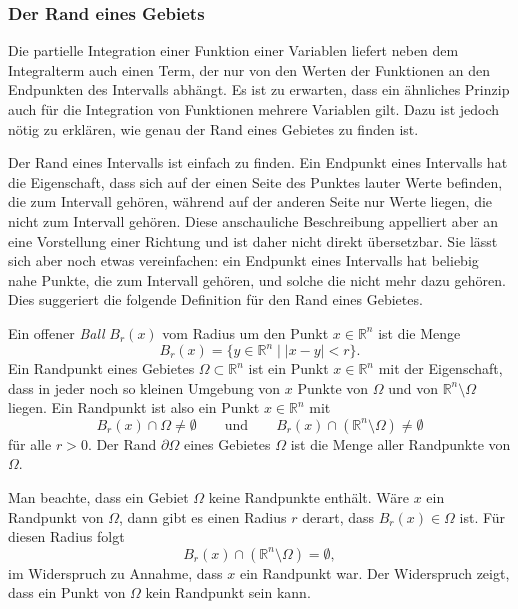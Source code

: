 %
%
\subsubsection{Der Rand eines Gebiets}
Die partielle Integration einer Funktion einer Variablen liefert
neben dem Integralterm auch einen Term, der nur von den Werten der
Funktionen an den Endpunkten des Intervalls abhängt.
Es ist zu erwarten, dass ein ähnliches Prinzip auch für die
Integration von Funktionen mehrere Variablen gilt.
Dazu ist jedoch nötig zu erklären, wie genau der Rand eines
Gebietes zu finden ist.

Der Rand eines Intervalls ist einfach zu finden.
Ein Endpunkt eines Intervalls hat die Eigenschaft, dass sich
auf der einen Seite des Punktes lauter Werte befinden, die zum
Intervall gehören, während auf der anderen Seite nur Werte liegen,
die nicht zum Intervall gehören.
Diese anschauliche Beschreibung appelliert aber an eine Vorstellung
einer Richtung und ist daher nicht direkt übersetzbar.
Sie lässt sich aber noch etwas vereinfachen: ein Endpunkt eines
Intervalls hat beliebig nahe Punkte, die zum Intervall gehören, und
solche die nicht mehr dazu gehören.
Dies suggeriert die folgende Definition für den Rand eines Gebietes.

\begin{definition}[Rand]
\label{buch:felder:fundamentallemma:def:rand}
Ein offener {\em Ball} $B_r(x)$ vom Radius um den Punkt $x\in\mathbb{R}^n$
%
ist die Menge
\[
B_r(x)
=
\{y\in\mathbb{R}^n \mid |x-y|<r\}.
\]
Ein Randpunkt eines Gebietes $\Omega\subset\mathbb{R}^n$ ist ein Punkt
$x\in\mathbb{R}^n$ mit der Eigenschaft, dass in jeder noch so kleinen 
Umgebung von $x$ Punkte von $\Omega$ und von $\mathbb{R}^n\setminus\Omega$
liegen.
Ein Randpunkt ist also ein Punkt $x\in\mathbb{R}^n$ mit
\[
B_r(x)\cap \Omega\ne \emptyset
\qquad\text{und}\qquad
B_r(x)\cap (\mathbb{R}^n\setminus \Omega)
\ne \emptyset
\]
für alle $r>0$.
Der Rand $\partial \Omega$ eines Gebietes $\Omega$ ist die Menge
aller Randpunkte von $\Omega$.
\end{definition}

Man beachte, dass ein Gebiet $\Omega$ keine Randpunkte enthält.
Wäre $x$ ein Randpunkt von $\Omega$, dann gibt es einen Radius $r$
derart, dass $B_r(x)\in\Omega$ ist.
Für diesen Radius folgt
\[
B_r(x)\cap (\mathbb{R}^n\setminus\Omega)
=
\emptyset,
\]
im Widerspruch zu Annahme, dass $x$ ein Randpunkt war.
Der Widerspruch zeigt, dass ein Punkt von $\Omega$ kein Randpunkt
sein kann.

